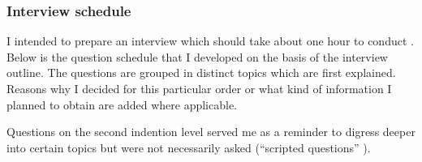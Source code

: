 \subsubsection{Interview schedule}

I intended to prepare an interview which should take about one hour to conduct \cite[p. 82-83]{berg01}. Below is the question schedule that I developed on the basis of the interview outline. The questions are grouped in distinct topics which are first explained. Reasons why I decided for this particular order or what kind of information I planned to obtain are added where applicable.

Questions on the second indention level served me as a reminder to digress deeper into certain topics but were not necessarily asked (\enquote{scripted questions} \cite[p. 92]{berg01}).

